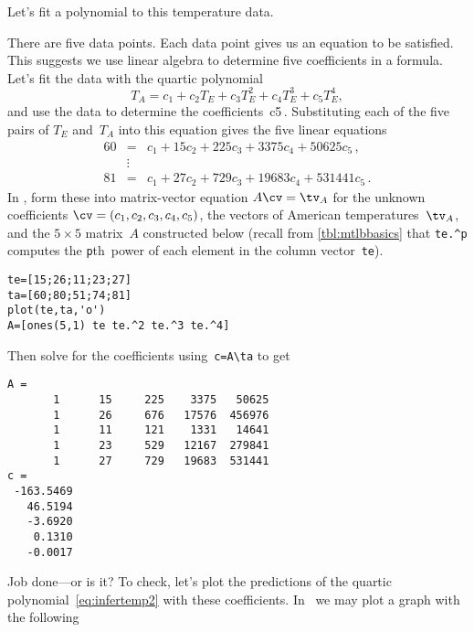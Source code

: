\begin{example}
Let's fit a polynomial to this temperature data.
\begin{solution}
There are five data points.
Each data point gives us an equation to be satisfied.
This suggests we use linear algebra to determine five coefficients in a formula.
Let's fit the data with the quartic polynomial
\begin{equation}
T_A=c_1+c_2T_E+c_3T_E^2+c_4T_E^3+c_5T_E^4,
\label{eq:infertemp2}
\end{equation}
and use the data to determine the coefficients~\hlist c5\,.
Substituting each of the five pairs of \(T_E\) and~\(T_A\) into this equation gives the five linear equations
\begin{eqnarray*}
60&=&c_1+15c_2+225c_3+3375c_4+50625c_5\,, \\
&\vdots&\\
81&=&c_1+27c_2+729c_3+19683c_4+531441c_5\,.
\end{eqnarray*}
In \script, form these into matrix-vector equation \(A\cv=\tv_A\) for the unknown coefficients \(\cv=(c_1,c_2,c_3,c_4,c_5)\), the vectors of American temperatures~\(\tv_A\), and the \(5\times5\) matrix~\(A\) constructed below (recall from \autoref{tbl:mtlbbasics} that \verb|te.^p| computes the \verb|p|th~power of each element in the column vector~\verb|te|).
\setbox\ajrqrbox\hbox{}%
\marginpar{\usebox{\ajrqrbox\\[2ex]}}%
\begin{verbatim}
te=[15;26;11;23;27]
ta=[60;80;51;74;81]
plot(te,ta,'o')
A=[ones(5,1) te te.^2 te.^3 te.^4]
\end{verbatim}
Then solve for the coefficients using~\verb|c=A\ta| to get
\begin{verbatim}
A =
       1      15     225    3375   50625
       1      26     676   17576  456976
       1      11     121    1331   14641
       1      23     529   12167  279841
       1      27     729   19683  531441
c =
 -163.5469
   46.5194
   -3.6920
    0.1310
   -0.0017
\end{verbatim}
Job done---or is it?
To check, let's plot the predictions of the quartic polynomial~\eqref{eq:infertemp2} with these coefficients.
In \script\ we may plot a graph with the following
\setbox\ajrqrbox\hbox{}%
\marginpar{\usebox{\ajrqrbox\\[2ex]}}%

\end{solution}
\end{example}
